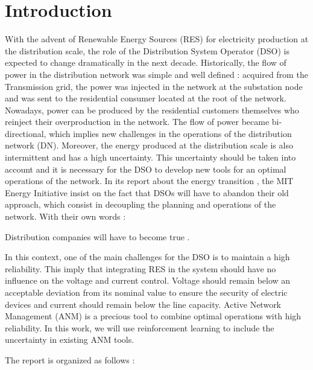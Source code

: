 \section{Introduction}
\label{sec:intro}
With the advent of Renewable Energy Sources (RES) for electricity production at the distribution scale, the role of the Distribution System Operator (DSO) is expected to change dramatically in the next decade. 
Historically, the flow of power in the distribution network was simple and well defined : acquired from the Transmission grid, the power was injected in the network at the substation node and was sent to the residential consumer located at the root of the network. 
Nowadays, power can be produced by the residential customers themselves who reinject their overproduction in the network.
The flow of power became bi-directional, which implies new challenges in the operations of the distribution network (DN). 
Moreover, the energy produced at the distribution scale is also intermittent and has a high uncertainty. 
This uncertainty should be taken into account and it is necessary for the DSO to develop new tools for an optimal operations of the network.
In its report about the energy transition \cite{utility}, the MIT Energy Initiative insist on the fact that DSOs will have to abandon their old  approach, which consist in decoupling the planning and operations of the network. 
With their own words : 
\begin{displayquote}
Distribution companies will have to become true .
\end{displayquote}

In this context, one of the main challenges for the DSO is to maintain a high reliability. 
This imply that integrating RES in the system should have no influence on the voltage and current control. 
Voltage should remain below an acceptable deviation from its nominal value to ensure the security of electric devices and current should remain below the line capacity. 
Active Network Management (ANM) is a precious tool to combine optimal operations with high reliability. 
In this work, we will use reinforcement learning to include the uncertainty in existing ANM tools. 

The report is organized as follows :